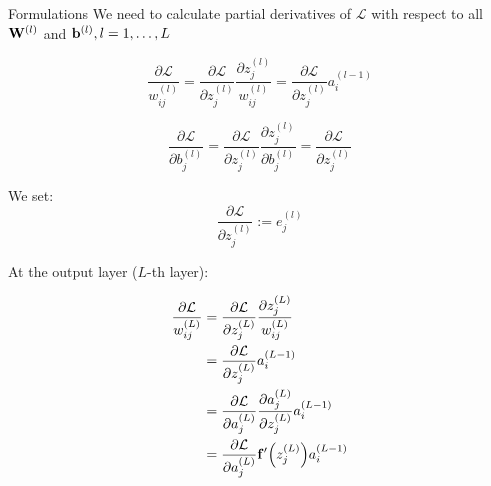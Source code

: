 \documentclass[10pt]{beamer}
\theoremstyle{remark}
\theoremstyle{definition}
\begin{document}
\begin{frame}[allowframebreaks]{Formulations}
	We need to calculate partial derivatives of $\mathcal{L}$ with respect to all $\bold{W}^{(l)}$ and $\bold{b}^{(l)}, l=1, \dots, L$

	\begin{equation}
		\dfrac{\partial \mathcal{L}}{w_{ij}^{(l)}}=\dfrac{\partial \mathcal{L}}{\partial z_{j}^{(l)}}\dfrac{\partial z_j^{(l)}}{w_{ij}^{(l)}}=\dfrac{\partial \mathcal{L}}{\partial z_{j}^{(l)}}a_i^{(l-1)}
	\end{equation}

	\begin{equation}
		\dfrac{\partial \mathcal{L}}{\partial b_j^{(l)}}=\dfrac{\partial \mathcal{L}}{\partial z_{j}^{(l)}}\dfrac{\partial z_j^{(l)}}{\partial b_j^{(l)}}=\dfrac{\partial \mathcal{L}}{\partial z_{j}^{(l)}}
	\end{equation}

	We set:
	\begin{equation}
		\dfrac{\partial \mathcal{L}}{\partial z_{j}^{(l)}}:=e_j^{(l)}
	\end{equation}

	At the output layer ($L$-th layer):

	\begin{equation}
		\begin{aligned}
			\dfrac{\partial \mathcal{L}}{w_{ij}^{(L)}}&=\dfrac{\partial \mathcal{L}}{\partial z_{j}^{(L)}}\dfrac{\partial z_j^{(L)}}{w_{ij}^{(L)}}\\&=\dfrac{\partial \mathcal{L}}{\partial z_{j}^{(L)}}a_i^{(L-1)}\\&=\dfrac{\partial\mathcal{L}}{\partial a_j^{(L)}}\dfrac{\partial a_j^{(L)}}{\partial z_j^{(L)}}a_i^{(L-1)}\\&=\dfrac{\partial\mathcal{L}}{\partial a_j^{(L)}}\bold{f}^{\prime}\Big(z_j^{(L)}\Big)a_i^{(L-1)}
		\end{aligned}
	\end{equation}


\end{frame}
\end{document}
